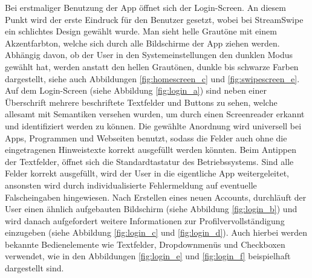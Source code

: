 Bei erstmaliger Benutzung der App öffnet sich der Login-Screen. An diesem Punkt wird der erste Eindruck für den Benutzer gesetzt, wobei bei StreamSwipe ein schlichtes Design gewählt wurde. Man sieht helle Grautöne mit einem Akzentfarbton, welche sich durch alle Bildschirme der App ziehen werden. Abhängig davon, ob der User in den Systemeinstellungen den dunklen Modus gewählt hat, werden anstatt den hellen Grautönen, dunkle bis schwarze Farben dargestellt, siehe auch Abbildungen \ref{fig:homescreen_c} und \ref{fig:swipescreen_e}.\\
Auf dem Login-Screen (siehe Abbildung \ref{fig:login_a}) sind neben einer Überschrift mehrere beschriftete Textfelder und Buttons zu sehen, welche allesamt mit Semantiken versehen wurden, um durch einen Screenreader erkannt und identifiziert werden zu können. Die gewählte Anordnung wird universell bei Apps, Programmen und Webseiten benutzt, sodass die Felder auch ohne die eingetragenen Hinweistexte korrekt ausgefüllt werden könnten. Beim Antippen der Textfelder, öffnet sich die Standardtastatur des Betriebssystems. Sind alle Felder korrekt ausgefüllt, wird der User in die eigentliche App weitergeleitet, ansonsten wird durch individualisierte Fehlermeldung auf eventuelle Falscheingaben hingewiesen. Nach Erstellen eines neuen Accounts, durchläuft der User einen ähnlich aufgebauten Bildschirm (siehe Abbildung \ref{fig:login_b}) und wird danach aufgefordert weitere Informationen zur Profilvervollständigung einzugeben (siehe Abbildung \ref{fig:login_c} und \ref{fig:login_d}). Auch hierbei werden bekannte Bedienelemente wie Textfelder, Dropdownmenüs und Checkboxen verwendet, wie in den Abbildungen \ref{fig:login_e} und \ref{fig:login_f} beispielhaft dargestellt sind.


